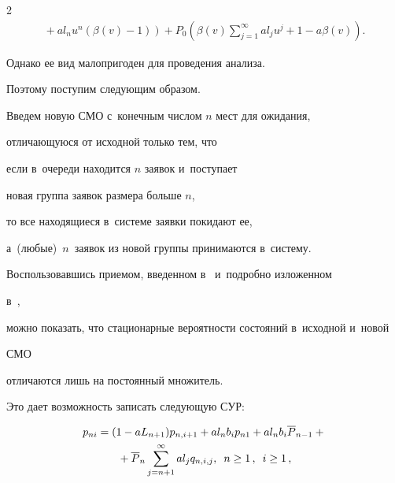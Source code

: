 \begin{multicols}{2}
\begin{multline*}
\!\!\left.{}+ a l_n u^n (\beta(v)\!-\!1) \right)+


P_0\! \left(\!\beta(v) \sum\limits_{j=1}^\infty a l_j u^j+\!1\!-a \beta(v)\!\!\right)\!\!.\!\!


\end{multline*}





\noindent 


Однако ее вид малопригоден для проведения анализа.


Поэтому поступим следующим образом.


Введем новую СМО с~конечным числом $n$ мест для ожидания,


отличающуюся от исходной только тем, что


если в~очереди находится $n$ заявок и~поступает


новая группа заявок размера больше $n$,


то все находящиеся в~системе заявки покидают ее,


а~(любые)~$n$~заявок из новой группы принимаются в~систему.


Воспользовавшись приемом, введенном в~\cite{n4} и~подробно изложенном 


в~\cite{distime},


можно показать, что стационарные вероятности состояний в~исходной и~новой 


СМО


отличаются лишь на постоянный множитель.


Это дает возможность записать следующую СУР:


\begin{multline}


\label{eq3r}


p_{ni}=(1-aL_{n+1})


p_{n,i+1}


+a l_n b_i p_{n1}


+a l_n b_i


{\overline P}_{n-1}+{}\\


{}+ {\overline P}_n


\sum\limits_{j=n+1}^{\infty} a l_j q_{n,i,j},


\enskip n \ge 1\,, \enskip i \ge 1\,,


\end{multline}





\noindent  



\end{multicols}

